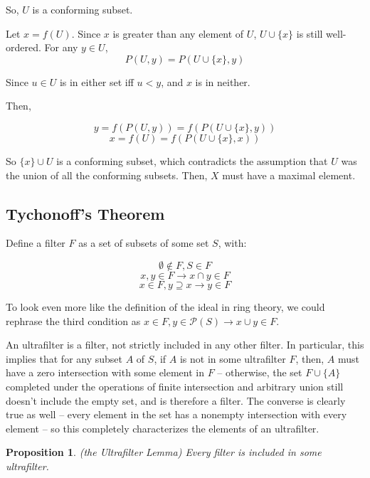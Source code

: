 \documentclass{article}
\newtheorem*{proposition}{Proposition}
\begin{document}
        So, $U$ is a conforming subset.

        Let $x = f(U)$. Since $x$ is greater than any element of $U$, $U \cup
        \{x\}$ is still well-ordered. For any $y \in U$,
        \[P(U,y) = P(U \cup\{x\},y)\]

        Since $u \in U$ is in either set iff $u < y$, and $x$ is in neither.

        Then,

        \[y = f(P(U,y)) = f(P(U \cup \{x\}, y))\]
        \[x = f(U) = f(P(U \cup \{x\}, x))\]


        So $\{x\} \cup U$ is a conforming subset, which contradicts the
        assumption that $U$ was the union of all the conforming subsets. Then,
        $X$ must have a maximal element.

      \subsection{Tychonoff's Theorem}

        Define a filter $F$ as a set of subsets of some set $S$, with:

        \[ \emptyset \notin F, S \in F\]
        \[ x, y \in F \rightarrow x \cap y \in F\]
        \[ x \in F, y \supseteq x \rightarrow y \in F\]

        To look even more like the definition of the ideal in ring theory, we
        could rephrase the third condition as $x \in F, y \in \mathcal{P}(S) \to
        x \cup y \in F$.

        An ultrafilter is a filter, not strictly included in any other filter.
        In particular, this implies that for any subset $A$ of $S$, if $A$ is
        not in some ultrafilter $F$, then, $A$ must have a zero intersection
        with some element in $F$ -- otherwise, the set $F \cup \{A\}$ completed
        under the operations of finite intersection and arbitrary union still
        doesn't include the empty set, and is therefore a filter. The converse
        is clearly true as well -- every element in the set has a nonempty
        intersection with every element -- so this completely characterizes the
        elements of an ultrafilter.

        \begin{proposition}
        (the Ultrafilter Lemma) Every filter is included in some ultrafilter.
        \end{proposition}
\end{document}
